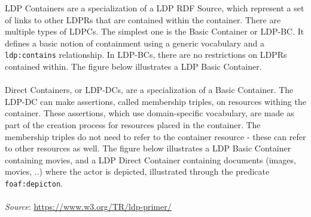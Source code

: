 \newpage
\begin{tcolorbox}[title={LDP Containers \hspace*{\fill}(optional reading)},enhanced,frame style image=images/gradient.png,parbox=false,breakable]

\noindent LDP Containers are a specialization of a LDP \gls{RDF} Source, which represent a set of links to other LDPRs that are contained within the container. There are multiple types of LDPCs. The simplest one is the Basic Container or LDP-BC. It defines a basic notion of containment using a generic vocabulary and a \texttt{ldp:contains} relationship. In LDP-BCs, there are no restrictions on LDPRs contained within. The figure below illustrates a LDP Basic Container.\\
\\
\noindent Direct Containers, or LDP-DCs, are a specialization of a Basic Container. The LDP-DC can make assertions, called membership triples, on resources withing the container. These assertions, which use domain-specific vocabulary, are made as part of the creation process for resources placed in the container. The membership triples do not need to refer to the container resource - these can refer to other resources as well. The figure below illustrates a LDP Basic Container containing movies, and a LDP Direct Container containing documents (images, movies, ..) where the actor is depicted, illustrated through the predicate \texttt{foaf:depicton}. \\
\\

\noindent \textit{Source}: \url{https://www.w3.org/TR/ldp-primer/}
\end{tcolorbox}

